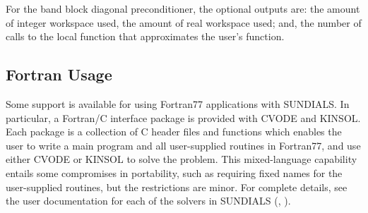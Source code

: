 For the band block diagonal preconditioner, the optional outputs are:
the amount of integer workspace used, the amount of real workspace
used; and, the number of calls to the local function that approximates
the user's function.

\subsection{Fortran Usage} 
\label{ss:Fortran_usage}

Some support is available for using Fortran77 applications with SUNDIALS.
In particular, a Fortran/C interface package is provided with CVODE
and KINSOL.
Each package is a collection of C header files and functions which
enables the user to write a main program and all user-supplied
routines in Fortran77, and use either CVODE or KINSOL to solve the
problem.
This mixed-language capability entails some compromises in
portability, such as requiring fixed names for the user-supplied
routines, but the restrictions are minor.
For complete details, see the user documentation for each of the solvers 
in SUNDIALS (\cite{HiSe:03a}, \cite{HiSe:03c}).
